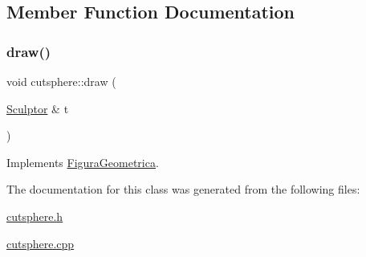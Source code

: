 \subsection{Member Function Documentation}
\mbox{\label{classcutsphere_a7dbeb4df030b362a0d11a758978dd37d}} 
\subsubsection{\texorpdfstring{draw()}{draw()}}
{\footnotesize\ttfamily void cutsphere\+::draw (\begin{DoxyParamCaption}\item[{\mbox{\hyperlink{class_sculptor}{Sculptor}} \&}]{t }\end{DoxyParamCaption})\hspace{0.3cm}{\ttfamily [virtual]}}



Implements \mbox{\hyperlink{class_figura_geometrica_a34585fd7c0bd7378fc69c4ee208e676c}{Figura\+Geometrica}}.



The documentation for this class was generated from the following files\+:\begin{DoxyCompactItemize}
\item 
\mbox{\hyperlink{cutsphere_8h}{cutsphere.\+h}}\item 
\mbox{\hyperlink{cutsphere_8cpp}{cutsphere.\+cpp}}\end{DoxyCompactItemize}
